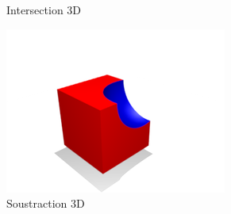 \begin{figure}[h]
\begin{minipage}[b]{0.3\linewidth}
    \caption{Intersection 3D}
    \label{intersection}
  \end{minipage}
  \hspace{0.075\linewidth} %
  \begin{minipage}[b]{0.3\linewidth}
    \centering
    \includegraphics[width=.9\linewidth]{images//sdf/soustraction.png}
    \caption{Soustraction 3D}
    \label{soustraction}
  \end{minipage}
\end{figure}








